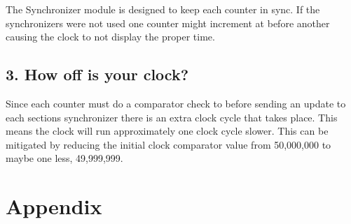 \documentclass{article}
\begin{document}
The Synchronizer module is designed to keep each counter in sync. If the synchronizers were not used one counter might increment at before another causing the clock to not display the proper time.

\subsection*{\textcolor{mycolor}{3. How off is your clock?}}
Since each counter must do a comparator check to before sending an update to each sections synchronizer there is an extra clock cycle that takes place. This means the clock will run approximately one clock cycle slower. This can be mitigated by reducing the initial clock comparator value from 50,000,000 to maybe one less, 49,999,999.
\newpage
\section*{\textcolor{mycolor}{Appendix}}
\end{document}
